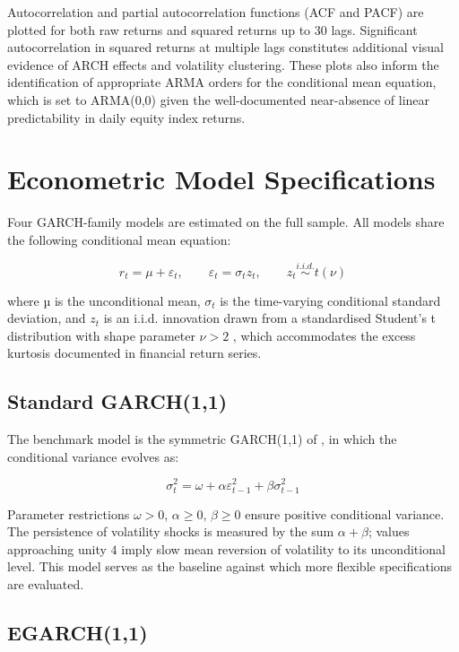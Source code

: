 Autocorrelation and partial autocorrelation functions (ACF and PACF)\citep{box2015time} are plotted for both raw returns and squared returns up to 30 lags. Significant autocorrelation in squared returns at multiple lags constitutes additional visual evidence of ARCH effects and volatility clustering. These plots also inform the identification of appropriate ARMA orders for the conditional mean equation, which is set to ARMA(0,0) given the well-documented near-absence of linear predictability in daily equity index returns. 

\section{ Econometric Model Specifications}

Four GARCH-family models are estimated on the full sample. All models share the following conditional mean equation:   


\begin{equation}
r_t = \mu + \varepsilon_t, \qquad
\varepsilon_t = \sigma_t z_t, \qquad
z_t \overset{i.i.d.}{\sim} t(\nu)
\end{equation}

where µ is the unconditional mean,  $\sigma_t$ is the time-varying conditional standard deviation, and $z_t$ is an i.i.d. innovation drawn from a standardised Student’s t distribution with shape parameter $\nu > 2$ \citep{Bollerslev1987}, which accommodates the excess kurtosis documented in financial return series. 

\subsection{Standard GARCH(1,1)}
The benchmark model is the symmetric GARCH(1,1) of \cite{bollerslev1986}, in which the conditional variance evolves as:

\begin{equation}
\sigma_t^2 = \omega + \alpha \varepsilon_{t-1}^2 + \beta \sigma_{t-1}^2
\end{equation}

Parameter restrictions $\omega > 0$, $\alpha \geq 0$, $\beta \geq 0$ ensure positive conditional variance. The persistence of volatility shocks is measured by the sum $\alpha + \beta$; values approaching unity $4$ imply slow mean reversion of volatility to its unconditional level. This model serves as the baseline against which more flexible specifications are evaluated.

\subsection{EGARCH(1,1)}

